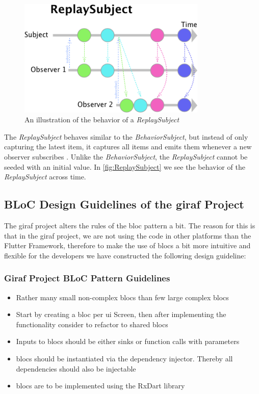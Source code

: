 \begin{figure}[h]
    \centering
    \includegraphics[width=0.8\textwidth]{figures/ReplaySubject.png}
    \caption{An illustration of the behavior of a \textit{ReplaySubject}}
    \label{fig:ReplaySubject}
\end{figure}

The \textit{ReplaySubject} behaves similar to the \textit{BehaviorSubject}, but instead of only capturing the latest item, it captures all items and emits them whenever a new observer subscribes \cite{ReplaySubject}. Unlike the \textit{BehaviorSubject}, the \textit{ReplaySubject} cannot be seeded with an initial value. In \autoref{fig:ReplaySubject} we see the behavior of the \textit{ReplaySubject} across  time.

\subsection{BLoC Design Guidelines of the \gls{giraf} Project}

The \gls{giraf} project alters the rules of the \gls{bloc} pattern a bit. The reason for this is that in the \gls{giraf} project, we are not using the code in other platforms than the Flutter Framework, therefore to make the use of \glspl{bloc} a bit more intuitive and flexible for the developers we have constructed the following design guideline:

\subsubsection{Giraf Project BLoC Pattern Guidelines}
\begin{itemize}
  \item Rather many small non-complex \glspl{bloc} than few large complex \glspl{bloc}
  \item Start by creating a \gls{bloc} per \gls{ui} Screen, then after implementing the functionality consider to refactor to shared \glspl{bloc}
  \item Inputs to \glspl{bloc} should be either sinks or function calls with parameters
  \item \glspl{bloc} should be instantiated via the dependency injector. Thereby all dependencies should also be injectable
  \item \glspl{bloc} are to be implemented using the RxDart library
\end{itemize}


